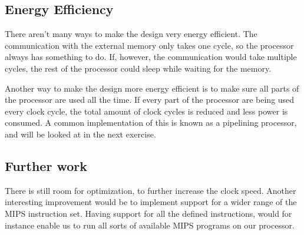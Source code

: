 \subsection{Energy Efficiency}
There aren't many ways to make the design very energy efficient.
The communication with the external memory only takes one cycle, so the processor always has something to do.
If, however, the communication would take multiple cycles, the rest of the processor could sleep while waiting for the memory.

Another way to make the design more energy efficient is to make sure all parts of the processor are used all the time.
If every part of the processor are being used every clock cycle,
the total amount of clock cycles is reduced and less power is consumed.
A common implementation of this is known as a pipelining processor, and will be looked at in the next exercise.

\subsection{Further work}

There is still room for optimization, to further increase the clock speed.
Another interesting improvement would be to implement support for a wider range of the MIPS instruction set.
Having support for all the defined instructions, would for instance enable us to run all sorts of available MIPS programs on our processor.
